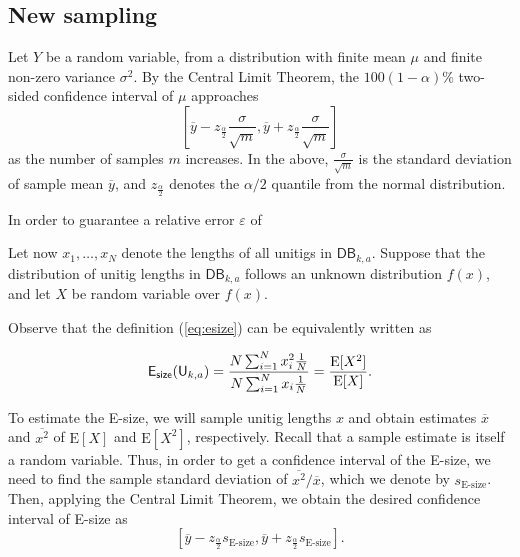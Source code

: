 \documentclass[a4paper,11pt]{article}
\newcommand{\alex}[1]{{\color{blue}{#1}}}
\newcommand{\DB}{\mathsf{DB}_{k,a}}
\newcommand{\U}{\mathsf{U}_{k,a}}
\newcommand{\esize}{{\sf E_{size}}}
\newcommand{\E}{\text{E}}
\begin{document}








\subsection{New sampling}

Let $Y$ be a random variable, from a distribution with finite mean $\mu$ and finite non-zero variance $\sigma^2$. By the Central Limit Theorem, the $100(1-\alpha)\%$ two-sided confidence interval of $\mu$ approaches 
\[\left[\overline{y} - z_{\frac{\alpha}{2}}\frac{\sigma}{\sqrt{m}} , \overline{y} + z_{\frac{\alpha}{2}}\frac{\sigma}{\sqrt{m}}\right] \]
as the number of samples $m$ increases. In the above, $\frac{\sigma}{\sqrt{m}}$ is the standard deviation of sample mean $\overline{y}$, and $z_{\frac{\alpha}{2}}$ denotes the $\alpha/2$ quantile from the normal distribution.

In order to guarantee a relative error $\varepsilon$ of 

Let now $x_1,\dots,x_N$ denote the lengths of all unitigs in $\DB$. Suppose that the distribution of unitig lengths in $\DB$ follows an unknown distribution $f(x)$, and let $X$ be random variable over $f(x)$.

Observe that the definition (\ref{eq:esize}) can be equivalently written as 

\[\esize(\U) = \frac{N \sum_{i = 1}^{N} x_i^2\frac{1}{N}}{N\sum_{i = 1}^{N} x_i\frac{1}{N}} = \frac{\E[X^2]}{\E[X]}.\]

To estimate the E-size, we will sample unitig lengths $x$ and obtain estimates $\overline{x}$ and $\overline{x^2}$ of $\E[X]$ and $\E[X^2]$, respectively. Recall that a sample estimate is itself a random variable. Thus, in order to get a confidence interval of the E-size, we need to find the sample standard deviation of $\overline{x^2}/\overline{x}$, which we denote by $s_{\text{E-size}}$. Then, applying the Central Limit Theorem, we obtain the desired confidence interval of E-size as 
\[\left[\overline{y} - z_{\frac{\alpha}{2}}s_{\text{E-size}} , \overline{y} + z_{\frac{\alpha}{2}}s_{\text{E-size}}\right]. \]
\end{document}
